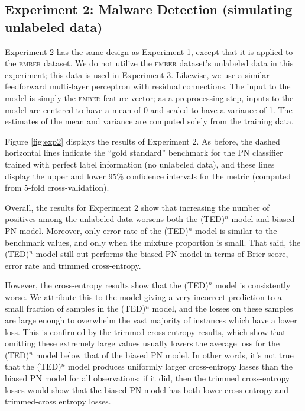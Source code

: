 \documentclass[conference]{IEEEtran}
\begin{document}
\subsection{Experiment 2: Malware Detection (simulating unlabeled data)}

    
    Experiment 2 has the same design as Experiment 1, except that it is applied to the \textsc{ember} dataset. We do not utilize the \textsc{ember} dataset's unlabeled data in this experiment; this data is used in Experiment 3. Likewise, we use a similar feedforward multi-layer perceptron with residual connections. The input to the model is simply the \textsc{ember} feature vector; as a preprocessing step, inputs to the model are centered to have a mean of 0 and scaled to have a variance of 1. The estimates of the mean and variance are computed solely from the training data.

    Figure \ref{fig:exp2} displays the results of Experiment 2. As before, the dashed horizontal lines indicate the ``gold standard'' benchmark for the PN classifier trained with perfect label information (no unlabeled data), and these lines display the upper and lower 95\% confidence intervals for the metric (computed from 5-fold cross-validation).

    Overall, the results for Experiment 2 show that increasing the number of positives among the unlabeled data worsens both the (TED)${}^n$ model and biased PN model. Moreover, only error rate of the (TED)${}^n$ model is similar to the benchmark values, and only when the mixture proportion is small. That said, the  (TED)${}^n$ model still out-performs the biased PN model in terms of Brier score, error rate and trimmed cross-entropy.

    However, the cross-entropy results show that the (TED)${}^n$ model is consistently worse. We attribute this to the model giving a very incorrect prediction to a small fraction of samples in the (TED)${}^n$ model, and the losses on these samples are large enough to overwhelm the vast majority of instances which have a lower loss. This is confirmed by the trimmed cross-entropy results, which show that omitting these extremely large values usually lowers the average loss for the (TED)${}^n$ model below that of the biased PN model. In other words, it's not true that the (TED)${}^n$ model produces uniformly larger cross-entropy losses than the biased PN model for all observations; if it did, then the trimmed cross-entropy losses would show that the biased PN model has both lower cross-entropy and trimmed-cross entropy losses. 
\end{document}
